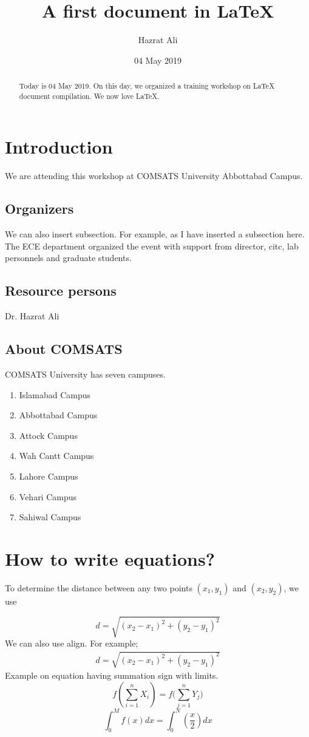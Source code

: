 \documentclass[12pt]{article}
\title{A first document in LaTeX}
\author{Hazrat Ali}
\date{04 May 2019}
\begin{document}
\maketitle
\begin{abstract}
Today is 04 May 2019. On this day, we organized a training workshop on LaTeX document compilation. We now love LaTeX.
\end{abstract}
%
\section{Introduction}
We are attending this workshop at COMSATS University Abbottabad Campus.
\subsection{Organizers}
We can also insert subsection. For example, as I have inserted a subsection here.
The ECE department organized the event with support from director, citc, lab personnels and graduate students.
\subsection{Resource persons}
Dr. Hazrat Ali
\subsection{About COMSATS}
COMSATS University has seven campuses.
\begin{enumerate}
	\item Islamabad Campus
	\item Abbottabad Campus
	\item Attock Campus
	\item Wah Cantt Campus
	\item Lahore Campus
	\item Vehari Campus
	\item Sahiwal Campus
\end{enumerate}

\section{How to write equations?}
To determine the distance between any two points $(x_1, y_1)$ and $(x_2, y_2)$, we use 

\begin{equation}
\label{eqn: distance}
	d = \sqrt{(x_2 - x_1)^2 + (y_2 - y_1)^2}
\end{equation}
We can also use align. For example;
\begin{align}
	d = \sqrt{(x_2 - x_1)^2 + (y_2 - y_1)^2}
\end{align}
Example on equation having summation sign with limits.
\begin{equation}
f \left( \sum_{i=1}^n X_i \right)
=
f \Biggl( \sum_{j=1}^n Y_j \Biggr)
\end{equation}
\begin{equation}
\int_0^M f(x) dx = \int_0^N
\left(\frac{x}{2}\right) dx
\end{equation}
\end{document}
